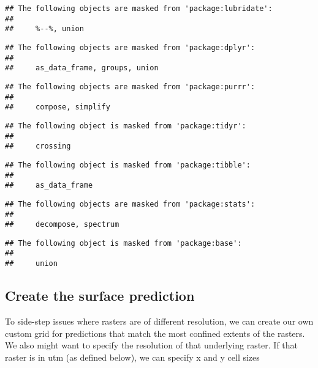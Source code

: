 \documentclass[
]{article}
\begin{document}
\begin{verbatim}
## The following objects are masked from 'package:lubridate':
## 
##     %--%, union
\end{verbatim}

\begin{verbatim}
## The following objects are masked from 'package:dplyr':
## 
##     as_data_frame, groups, union
\end{verbatim}

\begin{verbatim}
## The following objects are masked from 'package:purrr':
## 
##     compose, simplify
\end{verbatim}

\begin{verbatim}
## The following object is masked from 'package:tidyr':
## 
##     crossing
\end{verbatim}

\begin{verbatim}
## The following object is masked from 'package:tibble':
## 
##     as_data_frame
\end{verbatim}

\begin{verbatim}
## The following objects are masked from 'package:stats':
## 
##     decompose, spectrum
\end{verbatim}

\begin{verbatim}
## The following object is masked from 'package:base':
## 
##     union
\end{verbatim}

\hypertarget{create-the-surface-prediction}{%
\subsection{Create the surface
prediction}\label{create-the-surface-prediction}}

To side-step issues where rasters are of different resolution, we can
create our own custom grid for predictions that match the most confined
extents of the rasters. We also might want to specify the resolution of
that underlying raster. If that raster is in utm (as defined below), we
can specify x and y cell sizes
\end{document}
